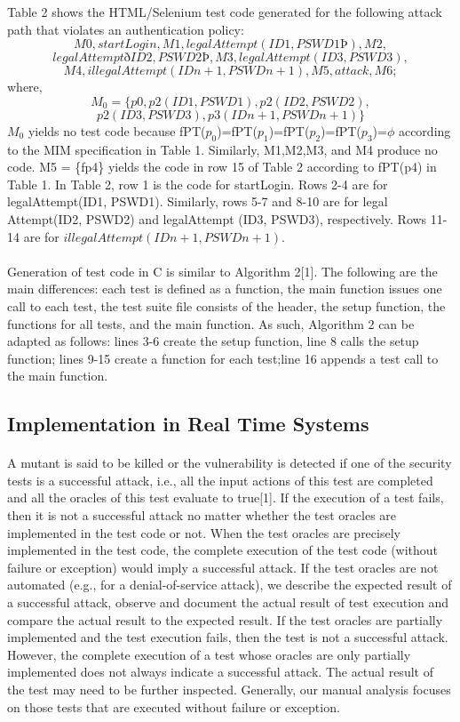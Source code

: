 Table 2 shows the HTML/Selenium test code generated
for the following attack path that violates an authentication
policy:
$$
M0,startLogin,M1,legalAttempt(ID1,PSWD1Þ),M2,$$$$legalAttemptðID2,PSWD2Þ,M3,legalAttempt(ID3, PSWD3),$$
$$M4,illegalAttempt(IDn+1,PSWDn+1),M5, attack,M6;
$$where,
$$M_0 = \{ p0, p2(ID1,PSWD1),p2(ID2,PSWD2),$$$$p2(ID3,PSWD3),p3(IDn+1,PSWDn+1)\}$$
$M_0$ yields no test code because fPT($p_0$)=fPT($p_1$)=fPT($p_2$)=fPT($p_3$)=$\phi$ according to the MIM specification in Table 1. Similarly, M1,M2,M3, and M4 produce no code. M5 = \{fp4\} yields the code in row 15 of Table 2 according to fPT(p4) in
Table 1. In Table 2, row 1 is the code for startLogin. Rows 2-4 are for legalAttempt(ID1, PSWD1). Similarly, rows 5-7 and 8-10 are for legal Attempt(ID2, PSWD2) and legalAttempt (ID3, PSWD3), respectively. Rows 11-14 are for $illegalAttempt(IDn+1,PSWDn+1).$
\paragraph{}
Generation of test code in C is similar to Algorithm 2[1].
The following are the main differences: each test is defined
as a function, the main function issues one call to each test,
the test suite file consists of the header, the setup function,
the functions for all tests, and the main function. As such,
Algorithm 2 can be adapted as follows: lines 3-6 create the
setup function, line 8 calls the setup function; lines 9-15
create a function for each test;line 16 appends a test call to
the main function.
\newpage
\begin{center}
\section{Implementation in Real Time Systems}
\end{center}
\paragraph*{}
A mutant is said to be killed or the vulnerability is detected if
one of the security tests is a successful attack, i.e., all the input
actions of this test are completed and all the oracles of this
test evaluate to true[1]. If the execution of a test fails, then it is
not a successful attack no matter whether the test oracles are
implemented in the test code or not. When the test oracles
are precisely implemented in the test code, the complete
execution of the test code (without failure or exception)
would imply a successful attack. If the test oracles are not
automated (e.g., for a denial-of-service attack), we describe
the expected result of a successful attack, observe and
document the actual result of test execution and compare the
actual result to the expected result. If the test oracles are
partially implemented and the test execution fails, then
the test is not a successful attack. However, the complete
execution of a test whose oracles are only partially
implemented does not always indicate a successful attack.
The actual result of the test may need to be further inspected.
Generally, our manual analysis focuses on those tests that are
executed without failure or exception.
